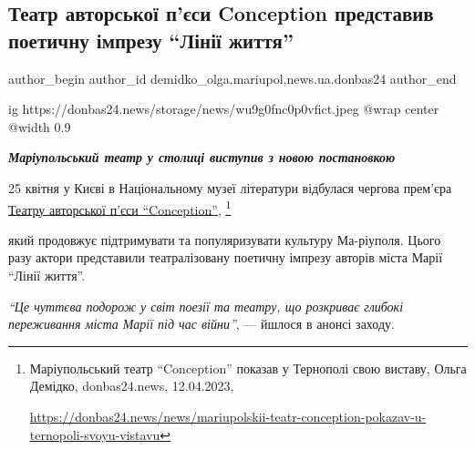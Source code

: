  
 
 
 
 
 
\subsection{Театр авторської п'єси Conception представив поетичну імпрезу \enquote{Лінії життя}}
\label{sec:26_04_2023.stz.news.ua.donbas24.1.teatr_conception_linii_zhyttja}
 
\ifcmt
 author_begin
   author_id demidko_olga.mariupol,news.ua.donbas24
 author_end
\fi

\ifcmt
  ig https://donbas24.news/storage/news/wu9g0fnc0p0vfict.jpeg
  @wrap center
  @width 0.9
\fi

\begin{center}
  \em\color{blue}\bfseries\Large
  Маріупольський театр у столиці виступив з новою постановкою
\end{center}

25 квітня у Києві в Національному музеї літератури відбулася чергова прем'єра
\href{https://donbas24.news/news/mariupolskii-teatr-conception-pokazav-u-ternopoli-svoyu-vistavu}{Театру
авторської п'єси \enquote{Conception}},%
\footnote{Маріупольський театр \enquote{Conception} показав у Тернополі свою виставу, Ольга Демідко, donbas24.news, 12.04.2023, \par\url{https://donbas24.news/news/mariupolskii-teatr-conception-pokazav-u-ternopoli-svoyu-vistavu}}

який продовжує підтримувати та популяризувати культуру Ма\hyp{}ріуполя. Цього разу
актори представили театралізовану поетичну імпрезу авторів міста Марії
\enquote{Лінії життя}.


\begin{leftbar}
\emph{\enquote{Це чуттєва подорож у світ поезії та театру, що розкриває глибокі переживання міста Марії під час війни}}, — йшлося в анонсі заходу. 
\end{leftbar}

